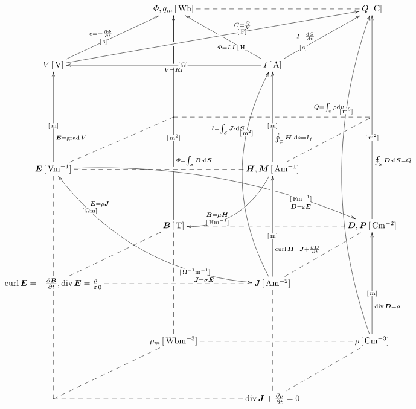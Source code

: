 \documentclass[a4j,10pt]{jarticle}
\makeatletter
\def\uni#1{[\unit{#1}]}
\def\cell#1#2{#1\,\uni{#2}}
\def\dottedhole#1{\ar@{--}[#1]|!{[ld];[lu]}\hole}
\def\dotted#1{\ar@{--}[#1]}
\def\arrow#1#2#3{\ar[#1]|-(.4){\uni{#2}}_(.3){#3}}
\def\arroww#1#2#3{\ar[#1]|-(.25){\uni{#2}}^(.4){#3}|!{[ll];[ru]}\hole}
\def\arrowu#1#2#3{\ar[#1]|-(.4){\uni{#2}}^(.45){#3}}
\def\arrowx#1#2#3{\ar[#1]|-(.6){\uni{#2}}^(.6){#3}}
\def\arrowy#1#2#3{\ar@/^3pc/[#1]|-(.7){\uni{#2}}^(.7){#3}}
\def\arrowyy#1#2#3#4#5{\ar@/_3pc/@{<->}[#1]|-(0.2){\uni{#4}}^(0.2){#5}|-(.75){\uni{#2}}_(.75){#3}}
\def\arrowz#1#2#3{\ar@/^2pc/[#1]|-(.7){\uni{#2}}_(.6){#3}}
\def\arrowzz#1#2#3{\ar@/^2pc/[#1] |!{[rr];[rrdd]}\hole |-(.8){\uni{#2}}_(.8){#3\quad}}
\def\arrowp#1#2#3{\ar@{->}[#1] _(.3){#3} |!{[u];[u]}\hole |-(0.4){\uni{#2}} |!{[uuu];[uuu]}\hole |!{[luuu];[ruuuru]}\hole} %
\def\B{\bm B}
\def\D{\bm D}
\def\E{\bm E}
\def\H{\bm H}
\def\J{\bm J}
\def\S{\bm S}
\def\P{\bm P}
\def\M{\bm M}
\makeatother
\begin{document}
\[\xymatrix@=0.70in{
 & \cell{\varPhi, q_m}{Wb}\dotted{rr}\ar @{-}[d]|!{[ld];[rr]}\hole     &        & \cell{Q}{C}\\
 \cell V V\arrowu{ur}{s}{e=-\fracpd\varPhi t}\arrowx{rrru}{F}{C=\frac Q V}      &          & \cell I A\arrowu{ll}{O}{V=RI}\arroww{ur}{s}{I=\diff Q t}\arroww{lu}{H}{\varPhi=LI}        & \\
 & *=0{}         & *=0{}       & \dottedhole{ll}\dotted{ld}\\
 \cell{\E}{Vm^{-1}}\arrow{uu}{m}{\E=\grad V}\dotted{rr}\dotted{ru}\arrowzz{rrrd}{Fm^{-1}}{\D=\varepsilon\E}\arrowyy{rrdd}{O^{-1}m^{-1}}{\J=\sigma\E}{Om}{\E=\rho\J } &          & \cell{\H,\M}{Am^{-1}}\arrow{uu}{m}{\oint_C\H\cdot\dd s=I_f}\arrowz{dl}{Hm^{-1}}{\B=\mu\H}       & \\
 & \cell{\B}{T}\arrowp{uuuu}{m^2}{\varPhi=\int_S\B\cdot\dd\S} &        & \cell{\D,\P}{Cm^{-2}}\arrow{uuuu}{m^2}{\oint_S\D\cdot\dd\bm{S}=Q}\dottedhole{ll}\dotted{ld}\\
 {{\curl\E=-\frac{\partial\B}{\partial t}} ,{\diver\E=\frac\rho\varepsilon_0}}\dotted{uu}\dotted{rr}\dotted{ru}     &          & \cell{\J}{Am^{-2}}\arrow{uu}{m}{\curl\H=\J +\frac{\partial\D}{\partial t}}\arrowy{uuuu}{m^2}{I=\int_S\J\cdot\dd\S}\\
 & \cell{\rho_m}{Wbm^{-3}}\ar@{--}[uu]|!{[u];[u]}\hole      &        & \cell{\rho}{Cm^{-3}}\arrow{uu}{m}{\diver\D=\rho}\arrowy{uuuuuu}{m^3}{Q=\int_v\rho\dd v}\dottedhole{ll}\dotted{ld}\\
 *=0{} \dotted{uu}\dotted{rr}\dotted{ru}           &          & \diver\J +\frac{\partial\rho}{\partial t}=0\dotted{uu}      & \\
}\]
\end{document}

